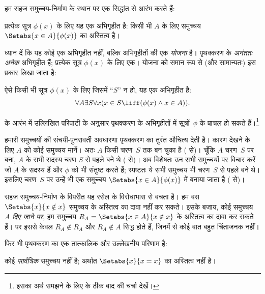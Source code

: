 \documentclass[../../../include/open-logic-section]{subfiles}
\begin{document}

हम सहज समुच्चय-निर्माण के स्थान पर एक सिद्धांत से आरंभ करते हैं:

\begin{axiom}[पृथक्करण की योजना] प्रत्येक सूत्र $\phi(x)$ के लिए यह एक
अभिगृहीत है: किसी भी $A$ के लिए समुच्चय $\Setabs{x \in A}{\phi(x)}$ का
अस्तित्व है।
\end{axiom}

ध्यान दें कि यह कोई एक अभिगृहीत नहीं, बल्कि अभिगृहीतों की एक \emph{योजना}
है। पृथक्करण के \emph{अनंततः अनेक} अभिगृहीत हैं; प्रत्येक सूत्र $\phi(x)$
के लिए एक। योजना को समान रूप से (और सामान्यतः) इस प्रकार लिखा जाता है:

\begin{defish}
ऐसे किसी भी सूत्र $\phi(x)$ के लिए जिसमें ``$S$'' न हो, यह एक अभिगृहीत है:
\[
	\forall A \exists S \forall x(x \in S \liff (\phi(x) \land x \in A)).
\]
\end{defish}

 के आरंभ में उल्लिखित परिपाटी के अनुसार पृथक्करण के
अभिगृहीतों में सूत्रों~$\phi$ के प्राचल हो सकते हैं।\footnote{इसका अर्थ
समझने के लिए  के ठीक बाद
की चर्चा देखें।}

हमारी समुच्चयों की संचयी-पुनरावर्ती अवधारणा पृथक्करण का तुरंत औचित्य देती
है। कारण देखने के लिए $A$ को कोई समुच्चय मानें। अतः $A$ किसी चरण~$S$ तक
बन चुका है (\stageshier{} से)। चूँकि $A$ चरण~$S$ पर बना, $A$ के सभी सदस्य
चरण $S$ से पहले बने थे (\stagesacc{} से)। अब विशेषतः उन सभी समुच्चयों पर
विचार करें जो $A$ के सदस्य हैं और $\phi$ को भी संतुष्ट करते हैं; स्पष्टतः
ये सभी समुच्चय भी चरण~$S$ से पहले बने थे। इसलिए चरण~$S$ पर उन्हें भी एक
समुच्चय $\Setabs{x \in A}{\phi(x)}$ में बनाया जाता है (\stagesacc{} से)।

सहज समुच्चय-निर्माण के विपरीत यह रसेल के विरोधाभास से बचता है। हम बस
$\Setabs{x}{x \notin x}$ समुच्चय के अस्तित्व का दावा नहीं कर सकते। इसके
बजाय, कोई समुच्चय~$A$ \emph{दिए जाने पर}, हम समुच्चय
$R_A = \Setabs{x \in A}{x \notin x}$ के अस्तित्व का दावा कर सकते हैं।
पर इससे केवल $R_A \notin R_A$ और $R_A \notin A$ सिद्ध होते हैं, जिनमें
से कोई बात बहुत चिंताजनक नहीं।

फिर भी पृथक्करण का एक तात्कालिक और उल्लेखनीय परिणाम है:

\begin{thm}
कोई \emph{सार्वत्रिक} समुच्चय नहीं है; अर्थात $\Setabs{x}{x = x}$ का
अस्तित्व नहीं है।
\end{thm}
\end{document}
